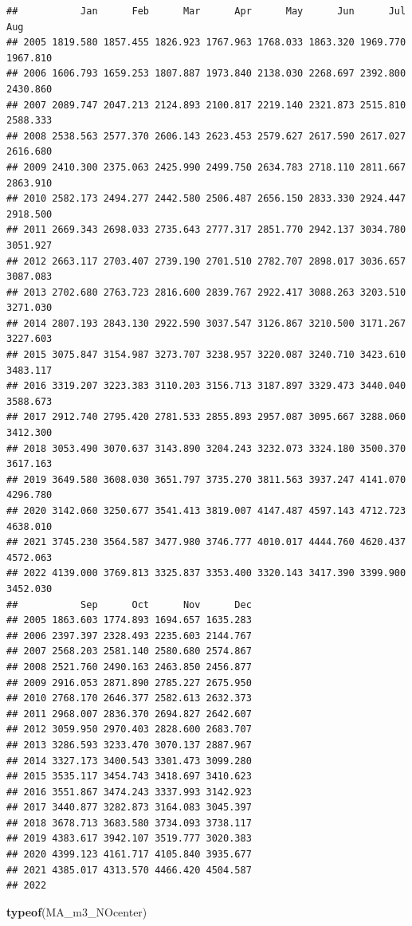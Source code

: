 \documentclass[
]{article}
\newenvironment{Shaded}{\begin{snugshade}}{\end{snugshade}}
\newcommand{\FunctionTok}[1]{\textcolor[rgb]{0.13,0.29,0.53}{\textbf{#1}}}
\newcommand{\NormalTok}[1]{#1}
\begin{document}
\begin{verbatim}
##           Jan      Feb      Mar      Apr      May      Jun      Jul      Aug
## 2005 1819.580 1857.455 1826.923 1767.963 1768.033 1863.320 1969.770 1967.810
## 2006 1606.793 1659.253 1807.887 1973.840 2138.030 2268.697 2392.800 2430.860
## 2007 2089.747 2047.213 2124.893 2100.817 2219.140 2321.873 2515.810 2588.333
## 2008 2538.563 2577.370 2606.143 2623.453 2579.627 2617.590 2617.027 2616.680
## 2009 2410.300 2375.063 2425.990 2499.750 2634.783 2718.110 2811.667 2863.910
## 2010 2582.173 2494.277 2442.580 2506.487 2656.150 2833.330 2924.447 2918.500
## 2011 2669.343 2698.033 2735.643 2777.317 2851.770 2942.137 3034.780 3051.927
## 2012 2663.117 2703.407 2739.190 2701.510 2782.707 2898.017 3036.657 3087.083
## 2013 2702.680 2763.723 2816.600 2839.767 2922.417 3088.263 3203.510 3271.030
## 2014 2807.193 2843.130 2922.590 3037.547 3126.867 3210.500 3171.267 3227.603
## 2015 3075.847 3154.987 3273.707 3238.957 3220.087 3240.710 3423.610 3483.117
## 2016 3319.207 3223.383 3110.203 3156.713 3187.897 3329.473 3440.040 3588.673
## 2017 2912.740 2795.420 2781.533 2855.893 2957.087 3095.667 3288.060 3412.300
## 2018 3053.490 3070.637 3143.890 3204.243 3232.073 3324.180 3500.370 3617.163
## 2019 3649.580 3608.030 3651.797 3735.270 3811.563 3937.247 4141.070 4296.780
## 2020 3142.060 3250.677 3541.413 3819.007 4147.487 4597.143 4712.723 4638.010
## 2021 3745.230 3564.587 3477.980 3746.777 4010.017 4444.760 4620.437 4572.063
## 2022 4139.000 3769.813 3325.837 3353.400 3320.143 3417.390 3399.900 3452.030
##           Sep      Oct      Nov      Dec
## 2005 1863.603 1774.893 1694.657 1635.283
## 2006 2397.397 2328.493 2235.603 2144.767
## 2007 2568.203 2581.140 2580.680 2574.867
## 2008 2521.760 2490.163 2463.850 2456.877
## 2009 2916.053 2871.890 2785.227 2675.950
## 2010 2768.170 2646.377 2582.613 2632.373
## 2011 2968.007 2836.370 2694.827 2642.607
## 2012 3059.950 2970.403 2828.600 2683.707
## 2013 3286.593 3233.470 3070.137 2887.967
## 2014 3327.173 3400.543 3301.473 3099.280
## 2015 3535.117 3454.743 3418.697 3410.623
## 2016 3551.867 3474.243 3337.993 3142.923
## 2017 3440.877 3282.873 3164.083 3045.397
## 2018 3678.713 3683.580 3734.093 3738.117
## 2019 4383.617 3942.107 3519.777 3020.383
## 2020 4399.123 4161.717 4105.840 3935.677
## 2021 4385.017 4313.570 4466.420 4504.587
## 2022
\end{verbatim}

\begin{Shaded}
\begin{Highlighting}[]
\FunctionTok{typeof}\NormalTok{(MA\_m3\_NOcenter)}
\end{Highlighting}
\end{Shaded}
\end{document}
